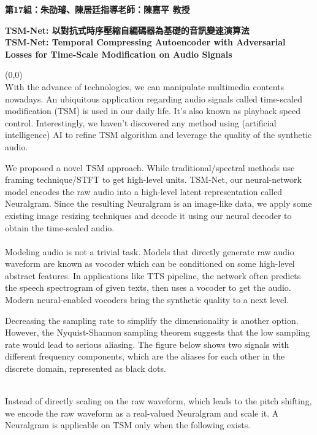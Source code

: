 \documentclass{article}
\begin{document}
\thispagestyle{empty}
\membersize \textbf{第17組：朱劭璿、陳居廷}\hspace{20.5cm}\textbf{指導老師：陳嘉平 教授}
\medskip

\titlesize \textbf{TSM-Net: 以對抗式時序壓縮自編碼器為基礎的音訊變速演算法 \\
TSM-Net: Temporal Compressing Autoencoder with Adversarial Losses for Time-Scale Modification on Audio Signals}

\begin{textblock}{7.0}(0,0)
 \\
\Large
With the advance of technologies, we can manipulate multimedia contents nowadays. An ubiquitous application regarding audio signals called time-scaled modification (TSM) is used in our daily life. It's also known as playback speed control. Interestingly, we haven't discovered any method using (artificial intelligence) AI to refine TSM algorithm and leverage the quality of the synthetic audio.

We proposed a novel TSM approach. While traditional/spectral methods use framing technique/STFT to get high-level units. TSM-Net, our neural-network model encodes the raw audio into a high-level latent representation called Neuralgram. Since the resulting Neuralgram is an image-like data, we apply some existing image resizing techniques and decode it using our neural decoder to obtain the time-scaled audio. \\

\medskip
{} \\
\Large
Modeling audio is not a trivial task. Models that directly generate raw audio waveform are known as vocoder which can be conditioned on some high-level abstract features. In applications like TTS pipeline, the network often predicts the speech spectrogram of given texts, then uses a vocoder to get the audio. Modern neural-enabled vocoders bring the synthetic quality to a next level.

Decreasing the sampling rate to simplify the dimensionality is another option. However, the Nyquist-Shannon sampling theorem suggests that the low sampling rate would lead to serious aliasing. The figure below shows two signals with different frequency components, which are the aliases for each other in the discrete domain, represented as black dots.

\large 

 \\
\Large
Instead of directly scaling on the raw waveform, which leads to the pitch shifting, we encode the raw waveform as a real-valued Neuralgram and scale it. A Neuralgram is applicable on TSM only when the following exists.
\end{textblock}
\end{document}
